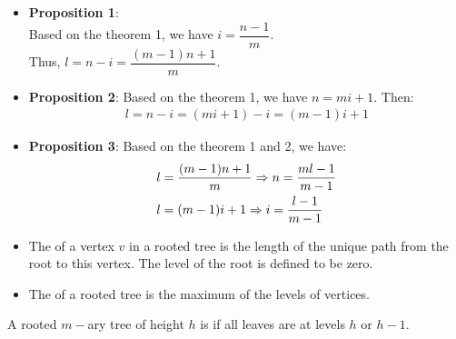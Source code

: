                 \begin{itemize}
                    \item \textbf{Proposition 1}: \\
                        Based on the theorem 1, we have $i = \dfrac{n - 1}{m}$. \\
                        Thus, $l = n - i = \dfrac{(m - 1)n + 1}{m}$.
                    \item \textbf{Proposition 2}: Based on the theorem 1, we have $n = mi + 1$.
                        Then:
                        \begin{align*}
                            l = n - i = (mi + 1) - i = (m - 1)i + 1
                        \end{align*}
                    \item \textbf{Proposition 3}: Based on the theorem 1 and 2, we have:
                        \begin{align*}
                            & l = \frac{(m - 1)n + 1}{m}
                            \Rightarrow n = \frac{ml - 1}{m - 1} \\
                            & l = (m - 1)i + 1
                            \Rightarrow i = \frac{l - 1}{m - 1}
                        \end{align*}
                \end{itemize}
        \hiiiEND
        
                \begin{itemize}
                    \item The  of a vertex $v$ in a rooted tree is the length of the
                        unique path from the root to this vertex. The level of the root is defined
                        to be zero.
                    \item The  of a rooted tree is the maximum of the levels of
                        vertices.
                \end{itemize}
                \par A rooted $m-$ary tree of height $h$ is  if all leaves are at
                levels $h$ or $h - 1$.
        \hiiiEND

